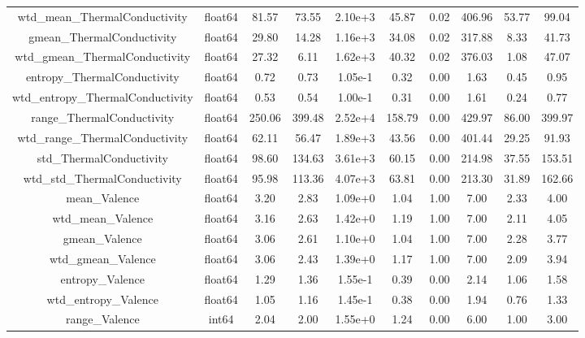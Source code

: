 \documentclass[11pt]{article}
\begin{document}
\begin{table}[H]
{\begin{tabular}{|c|c|c|c|c|c|c|c|c|c|}
wtd\_mean\_ThermalConductivity     & float64&    81.57&    73.55&  2.10e+3&    45.87&    0.02&    406.96&    53.77&    99.04 \\
gmean\_ThermalConductivity        & float64&    29.80&    14.28&  1.16e+3&    34.08&    0.02&    317.88&     8.33&    41.73 \\
wtd\_gmean\_ThermalConductivity    & float64&    27.32&     6.11&  1.62e+3&    40.32&    0.02&    376.03&     1.08&    47.07 \\
entropy\_ThermalConductivity      & float64&     0.72&     0.73&  1.05e-1&     0.32&    0.00&      1.63&     0.45&     0.95 \\
wtd\_entropy\_ThermalConductivity  & float64&     0.53&     0.54&  1.00e-1&     0.31&    0.00&      1.61&     0.24&     0.77 \\
range\_ThermalConductivity        & float64&   250.06&   399.48&  2.52e+4&   158.79&    0.00&    429.97&    86.00&   399.97 \\
wtd\_range\_ThermalConductivity    & float64&    62.11&    56.47&  1.89e+3&    43.56&    0.00&    401.44&    29.25&    91.93 \\
std\_ThermalConductivity          & float64&    98.60&   134.63&  3.61e+3&    60.15&    0.00&    214.98&    37.55&   153.51 \\
wtd\_std\_ThermalConductivity      & float64&    95.98&   113.36&  4.07e+3&    63.81&    0.00&    213.30&    31.89&   162.66 \\
mean\_Valence                     & float64&     3.20&     2.83&  1.09e+0&     1.04&    1.00&      7.00&     2.33&     4.00 \\
wtd\_mean\_Valence                 & float64&     3.16&     2.63&  1.42e+0&     1.19&    1.00&      7.00&     2.11&     4.05 \\
gmean\_Valence                    & float64&     3.06&     2.61&  1.10e+0&     1.04&    1.00&      7.00&     2.28&     3.77 \\
wtd\_gmean\_Valence                & float64&     3.06&     2.43&  1.39e+0&     1.17&    1.00&      7.00&     2.09&     3.94 \\
entropy\_Valence                  & float64&     1.29&     1.36&  1.55e-1&     0.39&    0.00&      2.14&     1.06&     1.58 \\
wtd\_entropy\_Valence              & float64&     1.05&     1.16&  1.45e-1&     0.38&    0.00&      1.94&     0.76&     1.33 \\
range\_Valence                    &   int64&     2.04&     2.00&  1.55e+0&     1.24&    0.00&      6.00&     1.00&     3.00 \\

\end{tabular}}
\end{table}
\end{document}
